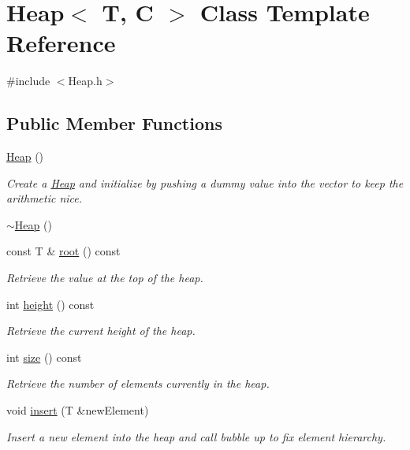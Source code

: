 \hypertarget{class_heap}{}\section{Heap$<$ T, C $>$ Class Template Reference}
\label{class_heap}


{\ttfamily \#include $<$Heap.\+h$>$}

\subsection*{Public Member Functions}
\begin{DoxyCompactItemize}
\item 
\hyperlink{class_heap_a2e61f237aa354f415fe7223289c9e73d}{Heap} ()
\begin{DoxyCompactList}\small\item\em Create a \hyperlink{class_heap}{Heap} and initialize by pushing a dummy value into the vector to keep the arithmetic nice. \end{DoxyCompactList}\item 
\hyperlink{class_heap_ae6331208a85445fc1c777616a3c40926}{$\sim$\+Heap} ()
\item 
const T \& \hyperlink{class_heap_a9bb09f07f20f872081127cf737c19002}{root} () const 
\begin{DoxyCompactList}\small\item\em Retrieve the value at the top of the heap. \end{DoxyCompactList}\item 
int \hyperlink{class_heap_a93422c2f293ed6397e8965aa5db2f9f7}{height} () const 
\begin{DoxyCompactList}\small\item\em Retrieve the current height of the heap. \end{DoxyCompactList}\item 
int \hyperlink{class_heap_a5d83dfc623283eeb94936992a914fbc2}{size} () const 
\begin{DoxyCompactList}\small\item\em Retrieve the number of elements currently in the heap. \end{DoxyCompactList}\item 
void \hyperlink{class_heap_abd103466ac991a2b9bb82a6e4bfa6a76}{insert} (T \&new\+Element)
\begin{DoxyCompactList}\small\item\em Insert a new element into the heap and call bubble up to fix element hierarchy. \end{DoxyCompactList}\item 

\end{DoxyCompactItemize}
